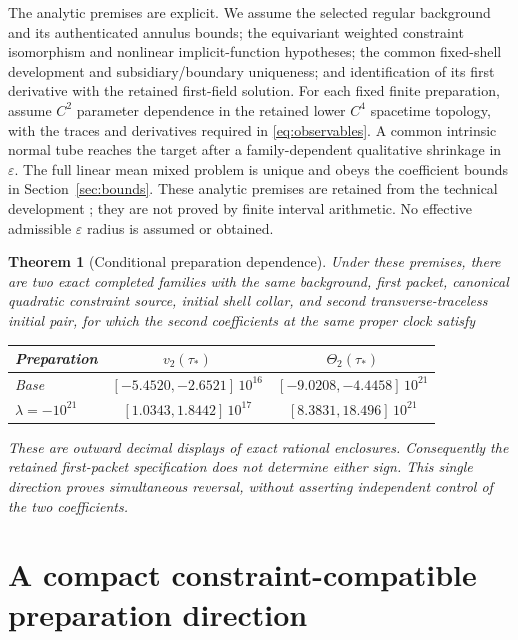 \documentclass[11pt]{article}
\newcommand{\eps}{\varepsilon}
\newtheorem{theorem}{Theorem}
\begin{document}
The analytic premises are explicit. We assume the selected regular
background and its authenticated annulus bounds; the equivariant weighted
constraint isomorphism and nonlinear implicit-function hypotheses;
the common fixed-shell development and subsidiary/boundary uniqueness;
and identification of its first derivative with the retained first-field
solution. For each fixed finite preparation, assume $C^2$ parameter
dependence in the retained lower $C^4$ spacetime topology, with the traces
and derivatives required in \eqref{eq:observables}. A common intrinsic
normal tube reaches the target after a family-dependent qualitative
shrinkage in $\eps$. The full linear mean mixed problem is unique and
obeys the coefficient bounds in Section~\ref{sec:bounds}. These analytic
premises are retained from the technical development \cite{records}; they
are not proved by finite interval arithmetic. No effective admissible
$\eps$ radius is assumed or obtained.

\begin{theorem}[Conditional preparation dependence]\label{thm:main}
Under these premises, there are two exact completed families with the
same background, first packet, canonical quadratic constraint source,
initial shell collar, and second transverse-traceless initial pair, for
which the second coefficients at the same proper clock satisfy
\begin{center}
\begin{tabular}{@{}lcc@{}}\toprule
Preparation & $v_2(\tau_*)$ & $\Theta_2(\tau_*)$\\\midrule
Base & $[-5.4520,-2.6521]\,10^{16}$ & $[-9.0208,-4.4458]\,10^{21}$\\
$\lambda=-10^{21}$ & $[1.0343,1.8442]\,10^{17}$ & $[8.3831,18.496]\,10^{21}$\\
\bottomrule
\end{tabular}
\end{center}
These are outward decimal displays of exact rational enclosures.
Consequently the retained first-packet specification does not determine
either sign. This single direction proves simultaneous reversal, without
asserting independent control of the two coefficients.
\end{theorem}

\section{A compact constraint-compatible preparation direction}
\end{document}
